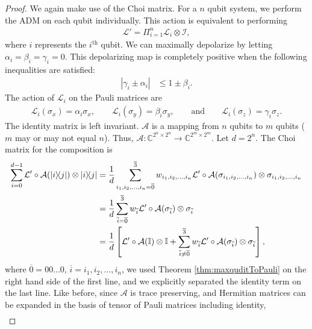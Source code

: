 \documentclass[12pt]{iopart}
\begin{document}
\begin{proof}
We again make use of the Choi matrix. For a $n$ qubit system, we perform the ADM on each qubit individually. This action is equivalent to performing
\begin{align}
    \mathcal{L}'=\Pi_{i=1}^n\mathcal{L}_i\otimes \mathcal{I},
\end{align}
where $i$ represents the $i^\text{th}$ qubit. We can maximally depolarize by letting $\alpha_i=\beta_i=\gamma_i=0$. This depolarizing map is completely positive when the following inequalities are satisfied:
\begin{align}
    |\gamma_i \pm \alpha_i| &\leq 1 \pm \beta_i.
\end{align}
The action of $\mathcal{L}_i$ on the Pauli matrices are
    \begin{align}\label{eq:asymPauli}
        \mathcal{L}_i(\sigma_x)=\alpha_i\sigma_x,\qquad \mathcal{L}_i(\sigma_y)=\beta_i\sigma_y, \qquad\text{and}\qquad \mathcal{L}_i(\sigma_z)=\gamma_i\sigma_z.
    \end{align}
The identity matrix is left invariant. $\mathcal{A}$ is a mapping from $n$ qubits to $m$ qubits ($m$ may or may not equal $n$). Thus, $\mathcal{A}: \mathbb{C}^{2^{n}\times 2^{n}}\rightarrow \mathbb{C}^{2^m\times 2^m}$. Let $d=2^n$. The Choi matrix for the composition is
\begin{align}\label{eq:generalCPproof0}
    \notag\sum_{i=0}^{d-1}\mathcal{L'}\circ\mathcal{A}(\op{i}{j})\otimes\op{i}{j}&=\dfrac{1}{d}\sum_{i_1,i_2,...,i_{n}=\overline{0}}^{\overline{3}}w_{i_1,i_2,...,i_{n}}\mathcal{L'}\circ\mathcal{A}(\sigma_{i_1,i_2,...,i_{n}})\otimes\sigma_{i_1,i_2,...,i_{n}}\\
    \notag &=\dfrac{1}{d}\sum_{\overline{i}=\overline{0}}^{\overline{3}} w_{\overline i}\mathcal{L'}\circ\mathcal{A}(\sigma_{\overline i})\otimes\sigma_{\overline i}\\
    &=\dfrac{1}{d}\left[\mathcal{L'}\circ\mathcal{A}(\mathbb{I})\otimes\mathbb{I}+\sum_{\overline{i}\neq\overline{0}}^{\overline{3}} w_{\overline{i}}\mathcal{L'}\circ\mathcal{A}(\sigma_{\overline{i}})\otimes\sigma_{\overline{i}}\right],
\end{align}
where $\overline{0}=00...0$, $\overline i=i_1,i_2,...,i_{n}$, we used Theorem \ref{thm:maxquditToPauli} on the right hand side of the first line, and we explicitly separated the identity term on the last line. Like before, since $\mathcal{A}$ is trace preserving, and Hermitian matrices can be expanded in the basis of tensor of Pauli matrices including identity,
\begin{align}\label{eq:generalCPproof1}

\end{align}
\end{proof}
\end{document}
